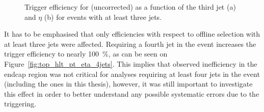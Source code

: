 \begin{figure}[hbtp]
  \centering
  \hfill
  \caption[\HLTThreeCentralPFJet trigger efficiency as a function of the third jet \pt and $\eta$]{Trigger
  efficiency for \HLTThreeCentralPFJet (uncorrected) as a function of the third jet \pt (a) and $\eta$ (b) for events
  with at least three jets.}
\label{fig:top_hlt_pt_eta_3jets} 
\end{figure}

It has to be emphasised that only efficiencies with respect to offline selection with at least three jets were affected.
Requiring a fourth jet in the event increases the trigger efficiency to nearly \SI{100}{\percent}, as can be seen on
Figure~\ref{fig:top_hlt_pt_eta_4jets}. This implies that observed inefficiency in the endcap region was not critical for
analyses requiring at least four jets in the event (including the ones in this thesis), however, it was still important
to investigate this effect in order to better understand any possible systematic errors due to the triggering.

